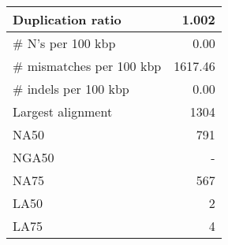 \documentclass[12pt,a4paper]{article}
\begin{document}
\begin{table}[ht]
\begin{center}
\begin{tabular}{|l*{1}{|r}|}
Duplication ratio & 1.002 \\ \hline
\# N's per 100 kbp & 0.00 \\ \hline
\# mismatches per 100 kbp & 1617.46 \\ \hline
\# indels per 100 kbp & 0.00 \\ \hline
Largest alignment & 1304 \\ \hline
NA50 & 791 \\ \hline
NGA50 & - \\ \hline
NA75 & 567 \\ \hline
LA50 & 2 \\ \hline
LA75 & 4 \\ \hline
\end{tabular}
\end{center}
\end{table}
\end{document}

